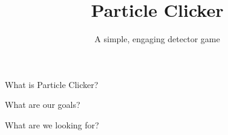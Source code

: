 \documentclass[compress,aspectratio=1610]{beamer}
\title{Particle Clicker}
\subtitle{A simple, engaging detector game}
\institute{CERN webfest 2014}
\begin{document}
\maketitle

\begin{frame}{What is Particle Clicker?}
\end{frame}

\begin{frame}{What are our goals?}
\end{frame}

\begin{frame}{What are we looking for?}
\end{frame}
\end{document}
